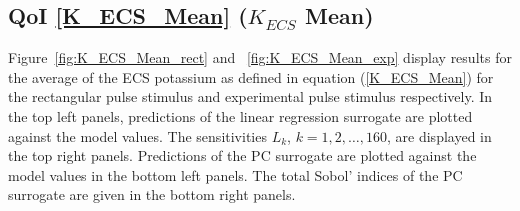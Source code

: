 \subsection{QoI \eqref{K_ECS_Mean} ($K_{ECS}$ Mean)}
\label{sec:qoi_K_ECS_Mean}

Figure~\ref{fig:K_ECS_Mean_rect} and ~\ref{fig:K_ECS_Mean_exp} display results for the average of the ECS potassium as defined in equation (\ref{K_ECS_Mean}) for the rectangular pulse stimulus and experimental pulse stimulus respectively. In the top left panels, predictions of the linear regression surrogate are plotted against the model values. The sensitivities $L_k$, $k=1,2,\dots,160$, are displayed in the top right panels. Predictions of the PC surrogate are plotted against the model values in the bottom left panels. The total Sobol' indices of the PC surrogate are given in the bottom right panels. 

